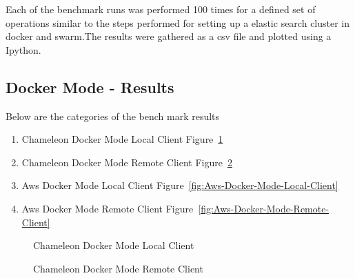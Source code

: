 \documentclass[9pt,twocolumn,twoside]{../../styles/osajnl}
\begin{document}
Each of the benchmark runs was performed 100 times for a defined set of operations similar to the steps performed for setting up a elastic search cluster in docker and swarm.The results were gathered as a csv file  and plotted using a Ipython\cite{www-ipython}.


\subsection{Docker Mode - Results}

Below are the categories of the bench mark results
\begin{enumerate}
\item Chameleon Docker Mode Local Client Figure~\ref{fig:Chameleon-Docker-Mode-Local-Client}
\item Chameleon Docker Mode Remote Client Figure~\ref{fig:Chameleon-Docker-Mode-Remote-Client}
\item Aws Docker Mode Local Client Figure~\ref{fig:Aws-Docker-Mode-Local-Client}
\item Aws Docker Mode Remote Client Figure~\ref{fig:Aws-Docker-Mode-Remote-Client}
\end{enumerate}


\begin{figure}[ht]
\centering
{}
\caption{Chameleon Docker Mode Local Client}
\label{fig:Chameleon-Docker-Mode-Local-Client}
\end{figure}


\begin{figure}[ht]
\centering
{}
\caption{Chameleon Docker Mode Remote Client}
\label{fig:Chameleon-Docker-Mode-Remote-Client}
\end{figure}
\end{document}
